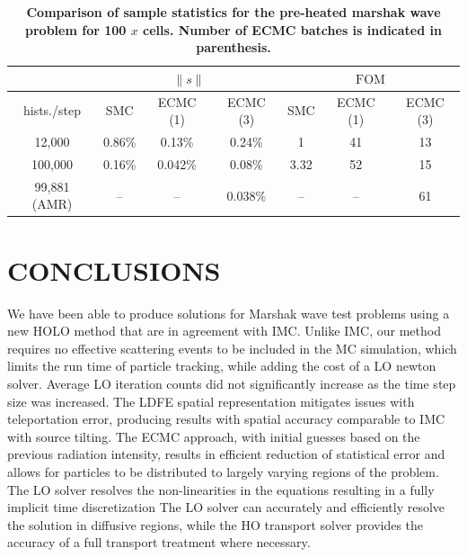 \documentclass[12pt]{article}
\renewcommand{\ss}{\ensuremath{\|s\|}}
\newcommand{\FOM}{\ensuremath{\text{FOM}}}
\begin{document}
\begin{center}
\begin{table}[H]
\centering
\caption{\label{preheat_var} \textbf{Comparison of sample statistics for the 
    pre-heated marshak wave problem for 100 $x$ cells. Number of ECMC batches is
indicated in parenthesis.}}
\vspace{-0.1in}
\begin{tabular}{|c|ccc|ccc|}\cline{2-7}
    \multicolumn{1}{c|}{}       & \multicolumn{3}{|c|}{\ss} &
    \multicolumn{3}{|c|}{\FOM} \\ \hline
hists./step   & SMC & ECMC (1) & ECMC (3)  & SMC & ECMC (1) & ECMC (3)   \\ \hline
   12,000	  & 0.86\%   & 0.13\% & 0.24\% & 1      & 41  & 13      \\
  100,000     & 0.16\%   & 0.042\% & 0.08\% & 3.32   & 52  & 15       \\
  99,881 (AMR) & --  & --  & 0.038\% & -- & -- &   61               \\ \hline
\end{tabular}
\end{table}


\section{CONCLUSIONS}

We have been able to produce solutions for Marshak wave test problems using
a new HOLO method that are in agreement with IMC.  Unlike IMC, our method requires no effective scattering
events to be included in the MC simulation, which limits the run time of particle
tracking, while adding the cost of a LO newton solver. Average LO iteration counts
did not significantly increase as the time step size was increased. The LDFE spatial representation
mitigates issues with teleportation error, producing results with spatial accuracy
comparable to IMC with source tilting.  The ECMC approach, with initial guesses based on the
previous radiation intensity, results in efficient reduction of statistical error and
allows for particles to be distributed to largely varying regions of the problem.
The LO solver resolves the non-linearities in the equations resulting in a fully
implicit time discretization
The LO solver
can accurately and efficiently resolve the solution in diffusive regions, while the HO
transport solver provides the accuracy of a full transport treatment where necessary. 


\end{center}
\end{document}
